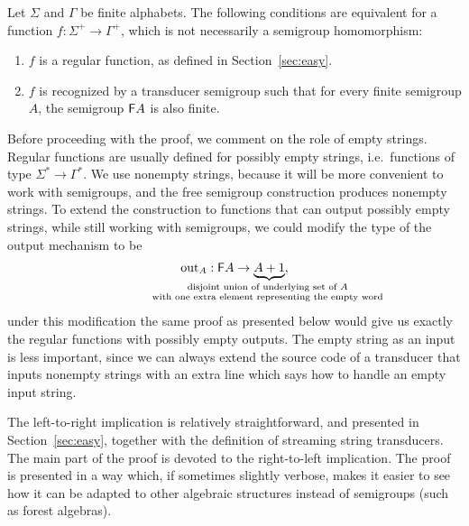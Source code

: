 

\begin{theorem}\label{thm:regular-functions}
    Let  $\Sigma$ and $\Gamma$  be finite alphabets. The following conditions are equivalent for a function $f : \Sigma^+ \to \Gamma^+$, which is not necessarily a semigroup homomorphism:
    \begin{enumerate}
        \item \label{it:regular} $f$ is  a regular function, as defined in  Section~\ref{sec:easy}. 
        \item \label{it:trans-semig-regular}$f$ is recognized by a transducer semigroup  such that for every finite semigroup $A$, the semigroup $\mathsf F A$ is also finite. 
    \end{enumerate}
\end{theorem}


Before proceeding with the proof, we comment on the role of empty strings. Regular functions are usually defined for possibly empty strings, i.e.~functions of type $\Sigma^* \to \Gamma^*$. We use nonempty strings, because it will be more convenient to work with semigroups, and the free semigroup construction produces nonempty strings. To extend the construction to functions that can output possibly empty strings, while still working with semigroups, we could modify the type of the output mechanism to be 
\begin{align*}
\outfun_A : \functor A \to \myunderbrace{A + 1}{disjoint union of underlying set of $A$ \\ with one extra element representing the empty word},
\end{align*}
under this modification the same proof as presented below would give us exactly the regular functions with possibly empty outputs. The empty string as an input is less important, since we can always  extend  the source code of a transducer that inputs nonempty strings with an extra line which says how to handle an empty input string. 


The left-to-right implication is relatively straightforward, and presented in Section~\ref{sec:easy}, together with the definition of streaming string transducers. The main part of the proof  is devoted to the right-to-left implication. The proof is presented in a way which, if sometimes slightly verbose, makes it easier to see how it can be adapted to other algebraic structures instead of semigroups (such as forest algebras).

